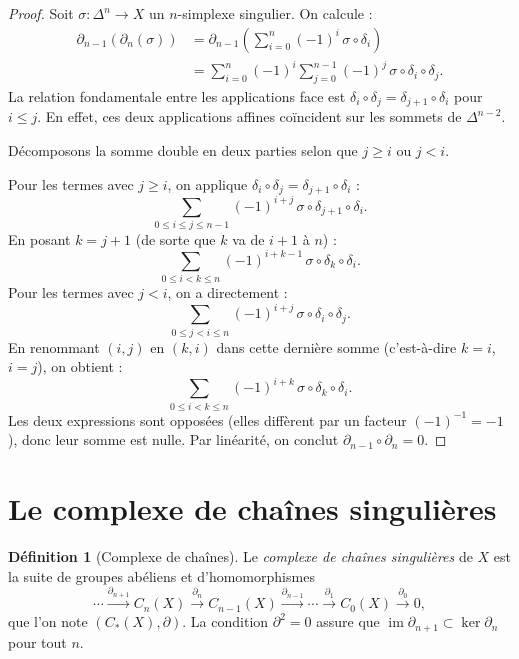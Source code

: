 \documentclass[12pt,a4paper,openany]{book}
\theoremstyle{definition}
\newtheorem{definition}{Définition}[chapter]
\theoremstyle{plain}
\theoremstyle{remark}
\DeclareMathOperator{\im}{im}
\begin{document}
\begin{proof}
Soit $\sigma \colon \Delta^n \to X$ un $n$-simplexe singulier. On calcule :
\begin{align*}
  \partial_{n-1}(\partial_n(\sigma))
  &= \partial_{n-1}\!\left(\sum_{i=0}^{n} (-1)^i\, \sigma \circ \delta_i\right) \\
  &= \sum_{i=0}^{n} (-1)^i \sum_{j=0}^{n-1} (-1)^j\, \sigma \circ \delta_i \circ \delta_j.
\end{align*}
La relation fondamentale entre les applications face est $\delta_i \circ \delta_j = \delta_{j+1} \circ \delta_i$
pour $i \leq j$. En effet, ces deux applications affines coïncident sur les sommets de $\Delta^{n-2}$.

Décomposons la somme double en deux parties selon que $j \geq i$ ou $j < i$.

Pour les termes avec $j \geq i$, on applique $\delta_i \circ \delta_j = \delta_{j+1} \circ \delta_i$ :
\[
  \sum_{0 \leq i \leq j \leq n-1} (-1)^{i+j}\, \sigma \circ \delta_{j+1} \circ \delta_i.
\]
En posant $k = j+1$ (de sorte que $k$ va de $i+1$ à $n$) :
\[
  \sum_{0 \leq i < k \leq n} (-1)^{i+k-1}\, \sigma \circ \delta_k \circ \delta_i.
\]
Pour les termes avec $j < i$, on a directement :
\[
  \sum_{0 \leq j < i \leq n} (-1)^{i+j}\, \sigma \circ \delta_i \circ \delta_j.
\]
En renommant $(i,j)$ en $(k,i)$ dans cette dernière somme (c'est-à-dire $k = i$, $i = j$), on obtient :
\[
  \sum_{0 \leq i < k \leq n} (-1)^{i+k}\, \sigma \circ \delta_k \circ \delta_i.
\]
Les deux expressions sont opposées (elles diffèrent par un facteur $(-1)^{-1} = -1$), donc leur somme est nulle.
Par linéarité, on conclut $\partial_{n-1} \circ \partial_n = 0$.
\end{proof}

\section{Le complexe de chaînes singulières}\label{sec:complexe-chaines}

\begin{definition}[Complexe de chaînes]\label{def:complexe-chaines}
Le \emph{complexe de chaînes singulières} de $X$ est la suite de groupes abéliens et d'homomorphismes
\[
  \cdots \xrightarrow{\partial_{n+1}} C_n(X) \xrightarrow{\partial_n} C_{n-1}(X) \xrightarrow{\partial_{n-1}} \cdots
  \xrightarrow{\partial_1} C_0(X) \xrightarrow{\partial_0} 0,
\]
que l'on note $(C_*(X), \partial)$. La condition $\partial^2 = 0$ assure que $\im \partial_{n+1} \subset \ker \partial_n$
pour tout $n$.
\end{definition}
\end{document}
